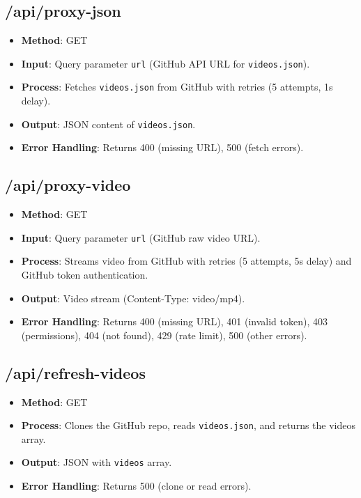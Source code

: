 \documentclass[a4paper,12pt]{article}
\begin{document}
\subsection{/api/proxy-json}
\begin{itemize}
    \item \textbf{Method}: GET
    \item \textbf{Input}: Query parameter \texttt{url} (GitHub API URL for \texttt{videos.json}).
    \item \textbf{Process}: Fetches \texttt{videos.json} from GitHub with retries (5 attempts, 1s delay).
    \item \textbf{Output}: JSON content of \texttt{videos.json}.
    \item \textbf{Error Handling}: Returns 400 (missing URL), 500 (fetch errors).
\end{itemize}

\subsection{/api/proxy-video}
\begin{itemize}
    \item \textbf{Method}: GET
    \item \textbf{Input}: Query parameter \texttt{url} (GitHub raw video URL).
    \item \textbf{Process}: Streams video from GitHub with retries (5 attempts, 5s delay) and GitHub token authentication.
    \item \textbf{Output}: Video stream (Content-Type: video/mp4).
    \item \textbf{Error Handling}: Returns 400 (missing URL), 401 (invalid token), 403 (permissions), 404 (not found), 429 (rate limit), 500 (other errors).
\end{itemize}

\subsection{/api/refresh-videos}
\begin{itemize}
    \item \textbf{Method}: GET
    \item \textbf{Process}: Clones the GitHub repo, reads \texttt{videos.json}, and returns the videos array.
    \item \textbf{Output}: JSON with \texttt{videos} array.
    \item \textbf{Error Handling}: Returns 500 (clone or read errors).
\end{itemize}
\end{document}
